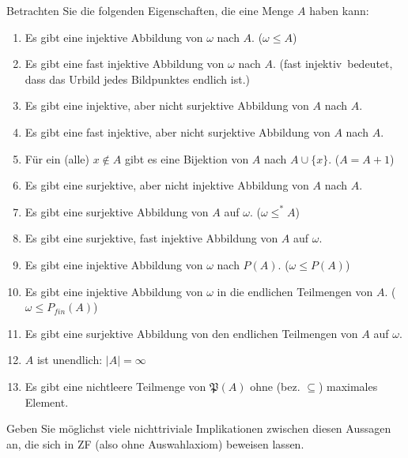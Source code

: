
\begin{exercise}[272]

Betrachten Sie die folgenden Eigenschaften, die eine Menge $A$ haben kann:

\begin{enumerate}[label = \alph*.]
  \item Es gibt eine injektive Abbildung von $\omega$ nach $A$. (\glqq $\omega \leq A$\grqq)
  \item Es gibt eine fast injektive Abbildung von $\omega$ nach $A$.
  (\glqq fast injektiv\grqq\ bedeutet, dass das Urbild jedes Bildpunktes endlich ist.)
  \item Es gibt eine injektive, aber nicht surjektive Abbildung von $A$ nach $A$.
  \item Es gibt eine fast injektive, aber nicht surjektive Abbildung von $A$ nach $A$.
  \item Für ein (alle) $x \notin A$ gibt es eine Bijektion von $A$ nach $A \cup \{x\}$.
  (\glqq $A = A + 1$\grqq)
  \item Es gibt eine surjektive, aber nicht injektive Abbildung von $A$ nach $A$.
  \item Es gibt eine surjektive Abbildung von $A$ auf $\omega$. (\glqq $\omega \leq^* A$\grqq)
  \item Es gibt eine surjektive, fast injektive Abbildung von $A$ auf $\omega$.
  \item Es gibt eine injektive Abbildung von $\omega$ nach $P(A)$. (\glqq $\omega \leq P(A)$\grqq)
  \item Es gibt eine injektive Abbildung von $\omega$ in die endlichen Teilmengen
  von $A$. (\glqq $\omega \leq P_{fin}(A)$\grqq)
  \item Es gibt eine surjektive Abbildung von den endlichen Teilmengen von $A$ auf $\omega$.
  \item $A$ ist unendlich: \glqq $|A| = \infty$\grqq
  \item Es gibt eine nichtleere Teilmenge von $\mathfrak{P}(A)$ ohne (bez. $\subseteq$)
  maximales Element.
\end{enumerate}

Geben Sie möglichst viele nichttriviale Implikationen zwischen diesen Aussagen an, die
sich in ZF (also ohne Auswahlaxiom) beweisen lassen.

\end{exercise}


